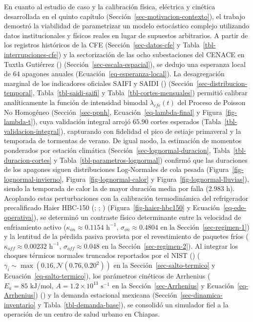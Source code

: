 \documentclass[
  spanish,
  letterpaper,
  DIV=11,
  numbers=noendperiod]{scrreprt}
\theoremstyle{plain}
\theoremstyle{plain}
\theoremstyle{plain}
\theoremstyle{definition}
\theoremstyle{remark}
\begin{document}
En cuanto al estudio de caso y la calibración física, eléctrica y
cinética desarrollada en el quinto capítulo
(Sección~\ref{sec-motivacion-contexto}), el trabajo demostró la
viabilidad de parametrizar un modelo estocástico complejo utilizando
datos institucionales y físicos reales en lugar de supuestos
arbitrarios. A partir de los registros históricos de la CFE
(Sección~\ref{sec-datos-cfe} y Tabla~\ref{tbl-interrupciones-cfe}) y la
sectorización de las ocho subestaciones del CENACE en Tuxtla Gutiérrez
()
(Sección~\ref{sec-escala-espacial}), se dedujo una esperanza local de
\(64\) apagones anuales (Ecuación~\ref{eq-esperanza-local}). La
desagregación marginal de los indicadores oficiales SAIFI y SAIDI
()
(Sección~\ref{sec-distribucion-temporal}, Tabla~\ref{tbl-saidi-saifi} y
Tabla~\ref{tbl-cortes-mensuales}) permitió calibrar analíticamente la
función de intensidad bimodal \(\lambda_{cfe}(t)\) del Proceso de
Poisson No Homogéneo (Sección~\ref{sec-ppnh},
Ecuación~\ref{eq-lambda-final} y Figura~\ref{fig-lambda-t}), cuya
validación integral arrojó \(65.90\) cortes esperados
(Tabla~\ref{tbl-validacion-integral}), capturando con fidelidad el pico
de estiaje primaveral y la temporada de tormentas de verano. De igual
modo, la estimación de momentos ponderados por estación climática
(Sección~\ref{sec-lognormal-duracion}, Tabla~\ref{tbl-duracion-cortes} y
Tabla~\ref{tbl-parametros-lognormal}) confirmó que las duraciones de los
apagones siguen distribuciones Log-Normales de cola pesada
(Figura~\ref{fig-lognormal-invierno}, Figura~\ref{fig-lognormal-calor} y
Figura~\ref{fig-lognormal-lluvias}), siendo la temporada de calor la de
mayor duración media por falla (\(2.983\text{ h}\)). Acoplando estas
perturbaciones con la calibración termodinámica del refrigerador
precalificado Haier HBC-150 (; ; )
(Figura~\ref{fig-haier-hbc150} y Ecuación~\ref{eq-ede-operativa}), se
determinó un contraste físico determinante entre la velocidad de
enfriamiento activo (\(\kappa_{on} \approx 0.1154\text{ h}^{-1}\),
\(\sigma_{on} \approx 0.4804\) en la Sección~\ref{sec-regimen-1}) y la
lentitud de la pérdida pasiva provista por el revestimiento de paquetes
fríos (\(\kappa_{off} \approx 0.00232\text{ h}^{-1}\),
\(\sigma_{off} \approx 0.048\) en la Sección~\ref{sec-regimen-2}). Al
integrar los choques térmicos normales truncados reportados por el NIST
()
(\(\gamma_i \sim \max(0.16, \mathcal{N}(0.76, 0.20^2))\) en la
Sección~\ref{sec-salto-termico} y Ecuación~\ref{eq-salto-termico}), los
parámetros cinéticos de Arrhenius (\(E_a = 85\text{ kJ/mol}\),
\(A = 1.2 \times 10^{13}\text{ s}^{-1}\) en la
Sección~\ref{sec-Arrhenius} y Ecuación~\ref{eq-Arrhenius})
() y la demanda estacional
mexicana (Sección~\ref{sec-dinamica-inventario} y
Tabla~\ref{tbl-demanda-base}), se consolidó un simulador fiel a la
operación de un centro de salud urbano en Chiapas.
\end{document}
